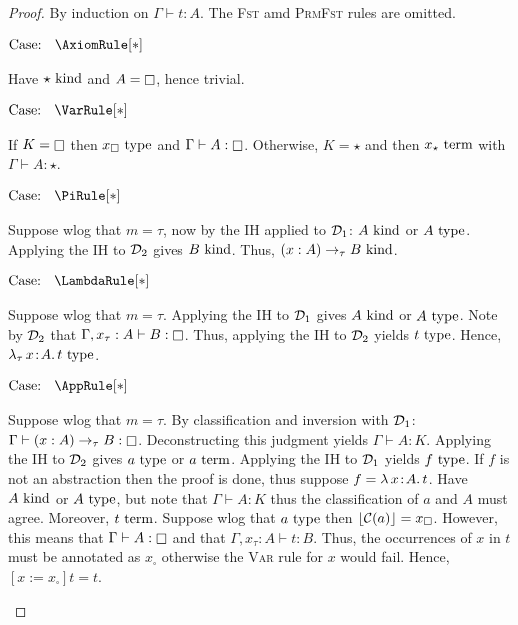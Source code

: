 \begin{proof}
    By induction on $\Gamma \vdash t : A$.
    The \textsc{Fst} amd \textsc{PrmFst} rules are omitted.

    $\text{Case: }\begin{array}{c} \AxiomRule[*] \end{array}$
    \begin{proofcase}
        Have $\star~\textnormal{kind}$ and $A = \kind$, hence trivial.
    \end{proofcase}

    $\text{Case: }\begin{array}{c} \VarRule[*] \end{array}$
    \begin{proofcase}
        If $K = \kind$ then $x_\square~\textnormal{type}$ and $\Gamma \vdash A : \kind$.
        Otherwise, $K = \star$ and then $x_\star~\textnormal{term}$ with $\Gamma \vdash A : \star$.
    \end{proofcase}

    $\text{Case: }\begin{array}{c} \PiRule[*] \end{array}$
    \begin{proofcase}
        Suppose wlog that $m = \tau$, now by the IH applied to $\mathcal{D}_{1}$: $A~\textnormal{kind}$ or $A~\textnormal{type}$.
        Applying the IH to $\mathcal{D}_{2}$ gives $B~\textnormal{kind}$.
        Thus, $(x : A) \to_\tau B~\textnormal{kind}$.
    \end{proofcase}

    $\text{Case: }\begin{array}{c} \LambdaRule[*] \end{array}$
    \begin{proofcase}
        Suppose wlog that $m = \tau$.
        Applying the IH to $\mathcal{D}_{1}$ gives $A~\textnormal{kind}$ or $A~\textnormal{type}$.
        Note by $\mathcal{D}_{2}$ that $\Gamma, x_\tau : A \vdash B : \kind$.
        Thus, applying the IH to $\mathcal{D}_{2}$ yields $t~\textnormal{type}$.
        Hence, ${\lambda_\tau}\, x\! : \! A.\, t~\textnormal{type}$.
    \end{proofcase}

    $\text{Case: }\begin{array}{c} \AppRule[*] \end{array}$
    \begin{proofcase}
        Suppose wlog that $m = \tau$.
        By classification and inversion with $\mathcal{D}_{1}$: $\Gamma \vdash (x : A) \to_\tau B : \kind$.
        Deconstructing this judgment yields $\Gamma \vdash A : K$.
        Applying the IH to $\mathcal{D}_{2}$ gives $a~\textnormal{type}$ or $a~\textnormal{term}$.
        Applying the IH to $\mathcal{D}_{1}$ yields $f~\textnormal{type}$.
        If $f$ is not an abstraction then the proof is done, thus suppose $f = {\lambda}\, x\! : \! A.\, t$.
        Have $A~\textnormal{kind}$ or $A~\textnormal{type}$, but note that $\Gamma \vdash A : K$ thus the classification of $a$ and $A$ must agree.
        Moreover, $t~\textnormal{term}$.
        Suppose wlog that $a~\textnormal{type}$ then $\lfloor \mathcal{C}(a) \rfloor = x_\square$.
        However, this means that $\Gamma \vdash A : \kind$ and that $\Gamma, x_\tau : A \vdash t : B$.
        Thus, the occurrences of $x$ in $t$ must be annotated as $x_\square$ otherwise the \textsc{Var} rule for $x$ would fail.
        Hence, $[x := x_\square]t = t$.
    \end{proofcase}


\end{proof}
